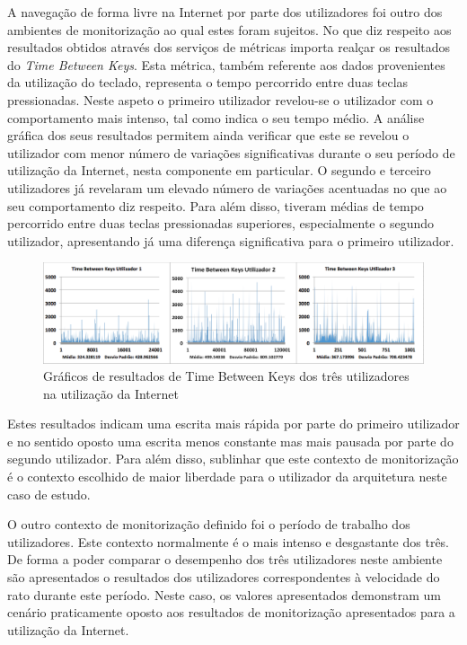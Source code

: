 A navegação de forma livre na Internet por parte dos utilizadores foi outro dos ambientes de monitorização ao qual estes foram sujeitos. No que diz respeito aos resultados obtidos através dos serviços de métricas importa realçar os resultados do \textit{Time Between Keys}. Esta métrica, também referente aos dados provenientes da utilização do teclado, representa o tempo percorrido entre duas teclas pressionadas. Neste aspeto o primeiro utilizador revelou-se o utilizador com o comportamento mais intenso, tal como indica o seu tempo médio. A análise gráfica dos seus resultados permitem ainda verificar que este se revelou o utilizador com menor número de variações significativas durante o seu período de utilização da Internet, nesta componente em particular. O segundo e terceiro utilizadores já revelaram um elevado número de variações acentuadas no que ao seu comportamento diz respeito. Para além disso, tiveram médias de tempo percorrido entre duas teclas pressionadas superiores, especialmente o segundo utilizador, apresentando já uma diferença significativa para o primeiro utilizador.

\begin{figure}[htb]
   \centering
   \includegraphics[scale=0.35]{Images/timebetweenkeys1.png}
   \caption{Gráficos de resultados de Time Between Keys dos três utilizadores na utilização da Internet}
\end{figure}

Estes resultados indicam uma escrita mais rápida por parte do primeiro utilizador e no sentido oposto uma escrita menos constante mas mais pausada por parte do segundo utilizador. Para além disso, sublinhar que este contexto de monitorização é o contexto escolhido de maior liberdade para o utilizador da arquitetura neste caso de estudo.

O outro contexto de monitorização definido foi o período de trabalho dos utilizadores. Este contexto normalmente é o mais intenso e desgastante dos três. De forma a poder comparar o desempenho dos três utilizadores neste ambiente são apresentados o resultados dos utilizadores correspondentes à velocidade do rato durante este período. Neste caso, os valores apresentados demonstram um cenário praticamente oposto aos resultados de monitorização apresentados para a utilização da Internet.

